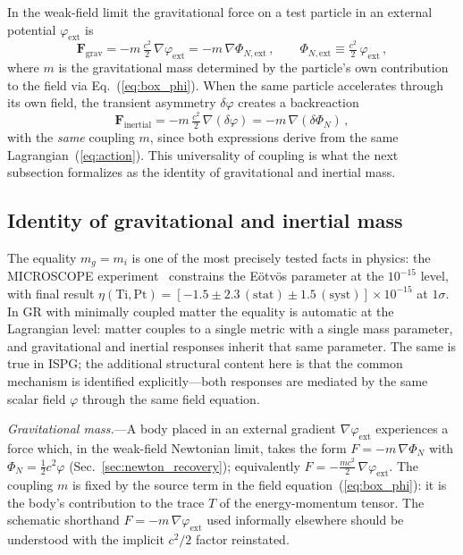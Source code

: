 \documentclass[aps,prd,onecolumn,superscriptaddress,nofootinbib,showpacs,12pt]{revtex4-2}
\begin{document}
In the weak-field limit the gravitational force on a
test particle in an external potential
$\varphi_{\mathrm{ext}}$ is
\begin{equation}\label{eq:F_grav}
  \mathbf{F}_{\mathrm{grav}}
  = -m\,\tfrac{c^{2}}{2}\,\nabla\varphi_{\mathrm{ext}}
  = -m\,\nabla\Phi_{N,\mathrm{ext}}\,,
  \qquad
  \Phi_{N,\mathrm{ext}}
  \equiv \tfrac{c^{2}}{2}\,\varphi_{\mathrm{ext}}\,,
\end{equation}
where $m$ is the gravitational mass determined by the
particle's own contribution to the field via
Eq.~(\ref{eq:box_phi}).  When the same particle
accelerates through its own field, the transient
asymmetry $\delta\varphi$ creates a backreaction
\begin{equation}\label{eq:F_inertial}
  \mathbf{F}_{\mathrm{inertial}}
  = -m\,\tfrac{c^{2}}{2}\,\nabla(\delta\varphi)
  = -m\,\nabla(\delta\Phi_{N})\,,
\end{equation}
with the \emph{same} coupling $m$, since both
expressions derive from the same
Lagrangian~(\ref{eq:action}).  This universality of
coupling is what the next subsection formalizes as the
identity of gravitational and inertial mass.

\subsection{Identity of gravitational and inertial mass}
\label{sec:mass_identity}

The equality $m_{g} = m_{i}$ is one of the most precisely
tested facts in physics: the MICROSCOPE
experiment~\cite{MICROSCOPE2022} constrains the
E\"otv\"os parameter at the $10^{-15}$ level, with final
result
$\eta(\mathrm{Ti},\mathrm{Pt}) =
[-1.5 \pm 2.3\,(\mathrm{stat})
 \pm 1.5\,(\mathrm{syst})]\times10^{-15}$ at $1\sigma$.
In GR with minimally coupled matter the equality is automatic at the
Lagrangian level: matter couples to a single metric with
a single mass parameter, and gravitational and inertial
responses inherit that same parameter.  The same is true
in ISPG; the additional structural content here is that
the common mechanism is identified explicitly---both
responses are mediated by the same scalar field
$\varphi$ through the same field equation.

\textit{Gravitational mass.}---A body placed in an
external gradient $\nabla\varphi_{\mathrm{ext}}$
experiences a force which, in the weak-field Newtonian
limit, takes the form
$F = -m\,\nabla\Phi_{N}$ with
$\Phi_{N} = \tfrac{1}{2}c^{2}\varphi$
(Sec.~\ref{sec:newton_recovery}); equivalently
$F = -\tfrac{mc^{2}}{2}\,\nabla\varphi_{\mathrm{ext}}$.
The coupling $m$ is fixed by the source term in the
field equation~(\ref{eq:box_phi}): it is the body's
contribution to the trace $T$ of the energy-momentum
tensor.  The schematic shorthand
$F = -m\,\nabla\varphi_{\mathrm{ext}}$ used informally
elsewhere should be understood with the implicit
$c^{2}/2$ factor reinstated.
\end{document}
